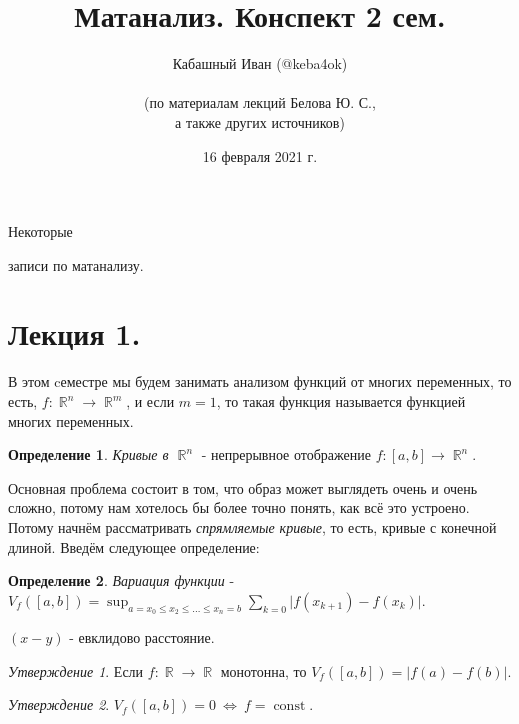 \documentclass[a4paper,100pt]{article}
\title{Матанализ. Конспект 2 сем.}
\author{Кабашный Иван (@keba4ok)\\ \\ (по материалам лекций Белова Ю. С.,\\ а также других источников)}
\date{16 февраля 2021 г.}
\theoremstyle{indented}
\theoremstyle{definition}
\newtheorem{defn}{Определение}
\theoremstyle{remark}
\newtheorem{stat}{Утверждение}
\DeclareMathOperator{\RR}{\mathbb{R}}
\DeclareMathOperator{\const}{const}
\begin{document}
\newcommand{\resetexlcounters}{%
  \setcounter{exl}{0}%
} 

\newcommand{\resetremarkcounters}{%
  \setcounter{remark}{0}%
} 

\newcommand{\reseconscounters}{%
  \setcounter{cons}{0}%
} 

\newcommand{\resetall}{%
    \resetexlcounters
    \resetremarkcounters
    \reseconscounters%
}

\maketitle 

\newpage

\hypertarget{t1}{Некоторые} записи по матанализу.

\tableofcontents

\newpage


\section{Лекция 1.}

В этом cеместре мы будем занимать анализом функций от многих переменных, то есть,  $f:\RR^n\rightarrow \RR^m$,  и если $m=1$, то такая функция называется функцией многих переменных. \ 

\begin{defn}
    \textit{Кривые в $\RR^n$} - непрерывное отображение $f:[a, b]\rightarrow \RR^n$.
\end{defn}

Основная проблема состоит в том, что образ может выглядеть очень и очень сложно, потому нам хотелось бы более точно понять, как всё это устроено. Потому начнём рассматривать \textit{спрямляемые кривые}, то есть, кривые с конечной длиной. Введём следующее определение: 

\begin{defn}
    \textit{Вариация функции} - $V_f([a, b])=\sup_{a=x_0\leq x_2\leq \ldots\leq x_n=b} \sum_{k=0}\vert f(x_{k+1})-f(x_k)\vert$. 
\end{defn}

$(x-y)$ - евклидово расстояние.

\begin{stat}
    Если $f:\RR\rightarrow \RR$ монотонна, то $V_f([a, b])=\vert f(a)-f(b)\vert $.
\end{stat}

\begin{stat}
    $V_f([a, b])=0 \: \Leftrightarrow \: f=\const$.
\end{stat}
\end{document}
